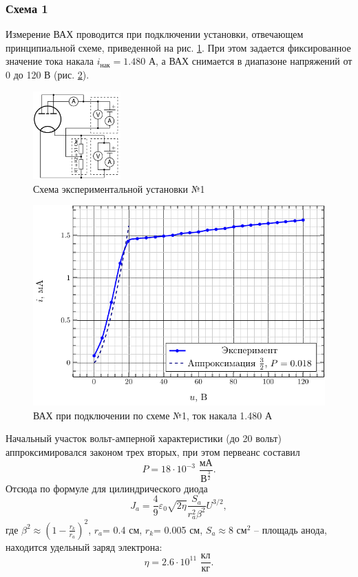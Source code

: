 \documentclass[a5paper,11pt]{extarticle}
\begin{document}
\subsubsection{Схема 1}
Измерение ВАХ проводится при подключении установки, отвечающем принципиальной схеме, приведенной на рис. \ref{fig:chem1}. При этом задается фиксированное значение тока накала $i_\text{нак}=1.480$ А, а ВАХ снимается в диапазоне напряжений от 0 до 120 В (рис. \ref{fig:vax1}).
\begin{figure}[H]
	\centering
	\includegraphics[width=0.3\textwidth]{img/z1.jpg}
	\vspace{-1em}
	\caption{Схема экспериментальной установки №1}
	\label{fig:chem1}
\end{figure}

\begin{figure}[H]
	\centering
	\includegraphics[scale=0.9]{fig/i_from_u_1.pdf}
	\vspace{-1em}
	\caption{ВАХ при подключении по схеме №1, ток накала 1.480 А}
	\label{fig:vax1}
\end{figure}

Начальный участок вольт-амперной характеристики (до 20 вольт) аппроксимировался законом трех вторых, при этом первеанс составил
\begin{equation}
	P=18\cdot 10^{-3} \,\,\frac{\text{мА}}{\text{В}^{\frac32}}.
\end{equation}
Отсюда по формуле для цилиндрического диода
\begin{equation}
J_a=\frac49 \varepsilon_0 \sqrt{2 \eta} \frac{S_a}{r_a^2 \beta^2} U^{3/2}, 
\end{equation}
где $\beta^2\approx(1-\frac{r_k}{r_a})^2$, $r_a$= 0.4 см, $r_k$= 0.005 см, $S_a\approx 8 \text{ см}^2$ -- площадь анода, находится  удельный заряд электрона: 
\begin{equation}
	\eta=2.6 \cdot 10^{11} \,\,\frac{\text{кл}}{\text{кг}}.
\end{equation}
\end{document}
